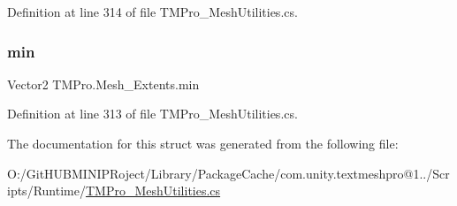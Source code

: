 Definition at line 314 of file T\+M\+Pro\+\_\+\+Mesh\+Utilities.\+cs.

\mbox{\label{struct_t_m_pro_1_1_mesh___extents_ad03e74e2e5661735bd825a31feae5c95}} 
\subsubsection{\texorpdfstring{min}{min}}
{\footnotesize\ttfamily Vector2 T\+M\+Pro.\+Mesh\+\_\+\+Extents.\+min}



Definition at line 313 of file T\+M\+Pro\+\_\+\+Mesh\+Utilities.\+cs.



The documentation for this struct was generated from the following file\+:\begin{DoxyCompactItemize}
\item 
O\+:/\+Git\+H\+U\+B\+M\+I\+N\+I\+P\+Roject/\+Library/\+Package\+Cache/com.\+unity.\+textmeshpro@1../\+Scripts/\+Runtime/\mbox{\hyperlink{_t_m_pro___mesh_utilities_8cs}{T\+M\+Pro\+\_\+\+Mesh\+Utilities.\+cs}}\end{DoxyCompactItemize}
